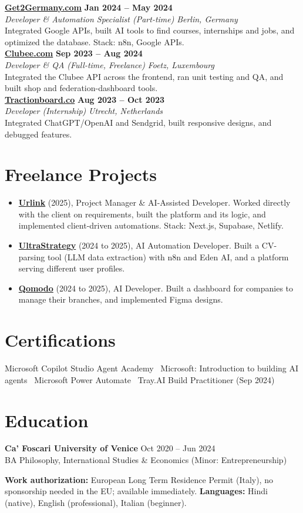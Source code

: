 \documentclass[a4paper,10pt]{article}
\newcommand{\role}[4]{%
 \textbf{#1} \hfill \textbf{#2}\\[1pt]%
 \textit{#3} \hfill \textit{#4}\\[2pt]%
}
\begin{document}
\role{\href{https://get2germany.com}{Get2Germany.com}}{Jan 2024 -- May 2024}{Developer \& Automation Specialist (Part-time)}{Berlin, Germany}
Integrated Google APIs, built AI tools to find courses, internships and jobs, and optimized the database. Stack: n8n, Google APIs.\\[1pt]

\role{\href{https://clubee.com}{Clubee.com}}{Sep 2023 -- Aug 2024}{Developer \& QA (Full-time, Freelance)}{Foetz, Luxembourg}
Integrated the Clubee API across the frontend, ran unit testing and QA, and built shop and federation-dashboard tools.\\[1pt]

\role{\href{https://tractionboard.co}{Tractionboard.co}}{Aug 2023 -- Oct 2023}{Developer (Internship)}{Utrecht, Netherlands}
Integrated ChatGPT/OpenAI and Sendgrid, built responsive designs, and debugged features.

\section{Freelance Projects}
\begin{itemize}
 \item \textbf{\href{https://smarturlink.com/}{Urlink}} (2025), Project Manager \& AI-Assisted Developer. Worked directly with the client on requirements, built the platform and its logic, and implemented client-driven automations. Stack: Next.js, Supabase, Netlify.
 \item \textbf{\href{https://ultrastrategy.com}{UltraStrategy}} (2024 to 2025), AI Automation Developer. Built a CV-parsing tool (LLM data extraction) with n8n and Eden AI, and a platform serving different user profiles.
 \item \textbf{\href{https://www.qomodo.me/}{Qomodo}} (2024 to 2025), AI Developer. Built a dashboard for companies to manage their branches, and implemented Figma designs.
\end{itemize}

\section{Certifications}
Microsoft Copilot Studio Agent Academy \textbullet\ Microsoft: Introduction to building AI agents \textbullet\ Microsoft Power Automate \textbullet\ Tray.AI Build Practitioner (Sep 2024)

\section{Education}
\textbf{Ca' Foscari University of Venice} \hfill Oct 2020 -- Jun 2024\\
BA Philosophy, International Studies \& Economics (Minor: Entrepreneurship)

\vspace{2pt}
{\small \textbf{Work authorization:} European Long Term Residence Permit (Italy), no sponsorship needed in the EU; available immediately. \quad \textbf{Languages:} Hindi (native), English (professional), Italian (beginner).}
\end{document}
